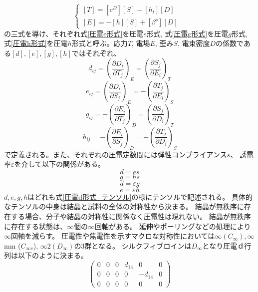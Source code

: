 \documentclass[dvipdfmx,12pt,a4paper]{jreport}
\begin{document}
			\begin{equation}
				\begin{cases}
					\left[T\right]=\left[c^D\right]\left[S\right]-\left[h_t\right]\left[D\right] & \\
					\left[E\right]=-\left[h\right]\left[S\right]+\left[\beta^s\right]\left[D\right]
				\end{cases}
				\label{圧電h形式}
			\end{equation}
			の三式を導け、それぞれ式\eqref{圧電e形式}を圧電$e$形式, 
			式\eqref{圧電g形式}を圧電$g$形式, 式\eqref{圧電h形式}を圧電$h$形式と呼ぶ。応力$T$, 電場$E$, 歪み$S$, 電束密度$D$の係数である$[d],[e],[g],[h]$ではそれぞれ、
			\begin{equation}
				d_{ij}=\left(\frac{\partial D_i}{\partial T_j}\right)_E=\left(\frac{\partial S_j}{\partial E_i}\right)_T
			\end{equation}
			\begin{equation}
				e_{ij}=\left(\frac{\partial D_i}{\partial S_j}\right)_E=-\left(\frac{\partial T_j}{\partial E_i}\right)_S
			\end{equation} 
			\begin{equation}
				g_{ij}=-\left(\frac{\partial E_i}{\partial T_j}\right)_D=\left(\frac{\partial S_j}{\partial D_i}\right)_T
			\end{equation}
			\begin{equation}
				h_{ij}=-\left(\frac{\partial E_i}{\partial S_j}\right)_D=-\left(\frac{\partial T_j}{\partial D_i}\right)_S
			\end{equation}
			で定義される。また、それぞれの圧電定数間には弾性コンプライアンス$s$、
			誘電率$\varepsilon$を介して以下の関係がある。
			\begin{equation}
				d = e s
				\label{e_to_d}
			\end{equation}
			\begin{equation}
				g = h s
			\end{equation}
			\begin{equation}
				d = \varepsilon g
			\end{equation}
			\begin{equation}
				e = \varepsilon h
			\end{equation}
			$d, e, g, h$はどれも式\eqref{圧電d形式_テンソル}の様にテンソルで記述される。
			具体的なテンソルの中身は結晶と試料の全体の対称性から決まる。
			結晶が無秩序に存在する場合、分子や結晶の対称性に関係なく圧電性は現れない。
			結晶が無秩序に存在する状態は、$\infty$個の$\infty$回軸がある。
			延伸やポーリングなどの処理により$\infty$回軸を減らす。
			圧電性や焦電性を示すマクロな対称性においては$\infty (C_\infty), \infty$ mm
			($C_{\infty v}$), $\infty 2(D_\infty)$の3群となる。
			シルクフィブロインは$D_\infty$となり圧電ｄ行列は以下のように決まる。
			\begin{equation}
				\left(
				\begin{array}{cccccc}
					0 & 0 & 0 & d_{14} & 0 & 0 \\
					0 & 0 & 0 & 0 & -d_{14} & 0 \\
					0 & 0 & 0 & 0 & 0 & 0
				\end{array}\right)
			\end{equation}
			\newpage
\end{document}
